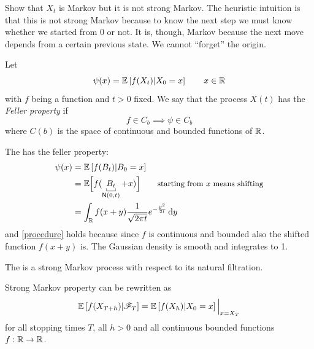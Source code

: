 \documentclass[12pt]{report}
\begin{document}
Show that $X_{t}$ is Markov but it is not strong Markov. The heuristic intuition is that this is not strong Markov because to know the next step we must know whether we started from 0 or not. It is, though, Markov because the next move depends from a certain previous state. We cannot ``forget'' the origin.
\begin{definition}
	Let 
	\begin{equation*}
		\psi(x)=\mathbb{E}\left[f(X_{t})|X_{0}=x\right]\qquad x\in\mathbb{R}
	\end{equation*}
	with $f$ being a function and $t>0$ fixed. We say that the process $X(t)$ has the \emph{Feller property} if
	\begin{equation}
		f\in C_{b}\implies \psi\in C_{b}\tag{\faProcedures}\label{procedure}
	\end{equation}
	where $C(b)$ is the space of continuous and bounded functions of $\mathbb{R}$.
\end{definition}
\begin{remark}
	The \bwm{} has the feller property:
	\begin{align*}
		\psi(x)&=\ev{f(B_{t})|B_{0}=x}\\
		&=\evs\Bigl[{f(\ubracketthin{B_{t}}_{\mathsf{N}(0,t)}+x)}\Bigr]\qquad\text{\small starting from $x$ means shifting}\\
		&=\int_{\R}f(x+y)\frac{1}{\sqrt{2\pi t}}e^{-\frac{y^{2}}{2t}}\dy
	\end{align*}
	and \ref{procedure} holds because since $f$ is continuous and bounded also the shifted function $f(x+y)$ is. The Gaussian density is smooth and integrates to 1.
\end{remark}
\begin{theorem}
	The \bwm{} is a strong Markov process with respect to its natural filtration.
\end{theorem}
\begin{remark}
	Strong Markov property can be rewritten as
	\begin{equation*}
		\mathbb{E}\left[f(X_{T+h})|\mathscr{F}_{T}\right]=\mathbb{E}\left[f(X_{h})|X_{0}=x\right]\Big|_{x=X_{T}}
	\end{equation*}
	for all stopping times $T$, all $h>0$ and all continuous bounded functions $f:\mathbb{R}\to\mathbb{R}$.
\end{remark}
\end{document}
